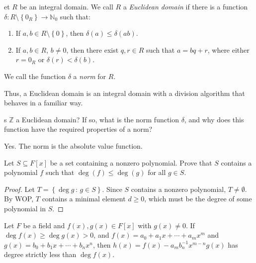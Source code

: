 \documentclass[english,course]{lecture}
\renewcommand{\le}{\leqslant}
\renewcommand{\ge}{\geqslant}
\theoremstyle{plain}
\newenvironment{question}[1]
  {\renewcommand\theinnerquestion{#1}\innerquestion}
  {\endinnerquestion}
\newenvironment{definition}[1]
  {\renewcommand\theinnerdefinition{#1}\innerdefinition}
  {\endinnerdefinition}
\def\set#1{\left\{ {#1} \right\}}
\def\setof#1#2{{\left\{#1\,\colon\,#2\right\}}}
\def\Z{{\mathbb Z}}
\def\N{{\mathbb N}}
\def\presnotes{}
\begin{document}
\begin{definition}
	Let $R$ be an integral domain.
	We call $R$ a \emph{Euclidean domain} if there is a function $\delta : R\setminus \set{0_R} \to \N_0$ such that: 
	\begin{enumerate}
		\item If $a,b\in R\setminus \set{0}$, then $\delta(a) \le \delta(ab)$.
		\item If $a,b\in R$, $b\ne 0$, then there exist $q,r\in R$ such that $a = bq+r$, where either $r = 0_R$ or $\delta(r) < \delta(b)$.
	\end{enumerate}
	We call the function $\delta$ a \emph{norm} for $R$.
\end{definition}

Thus, a Euclidean domain is an integral domain with a division algorithm that behaves in a familiar way.

\begin{question}
	Is $\Z$ a Euclidean domain? If so, what is the norm function $\delta$, and why does this function have the required properties of a norm?
\end{question}

\begin{answer}
	Yes. The norm is the absolute value function.
\end{answer}

\presnotes

\begin{lemma}\label{lem:minimaldegreepoly}
	Let $S\subseteq F[x]$ be a set containing a nonzero polynomial.
	Prove that $S$ contains a polynomial $f$ such that $\deg(f) \le \deg(g)$ for all $g\in S$.
\end{lemma}

\begin{proof}
	Let $T = \setof{\deg g}{g\in S}$.
	Since $S$ contains a nonzero polynomial, $T\ne \emptyset$.
	By WOP, $T$ contains a minimal element $d \ge 0$, which must be the degree of some polynomial in $S$.
\end{proof}

\presnotes

\begin{lemma}\label{lem:polydivalglem}
	Let $F$ be a field and $f(x),g(x)\in F[x]$ with $g(x)\ne 0$.
	If $\deg f(x) \ge \deg g(x) > 0$, and $f(x) = a_0 + a_1 x + \cdots + a_m x^m$ and $g(x) = b_0 + b_1 x + \cdots + b_n x^n$, then $h(x) = f(x) - a_m b_n^{-1} x^{m-n} g(x)$ has degree strictly less than $\deg f(x)$.
\end{lemma}
\end{document}
